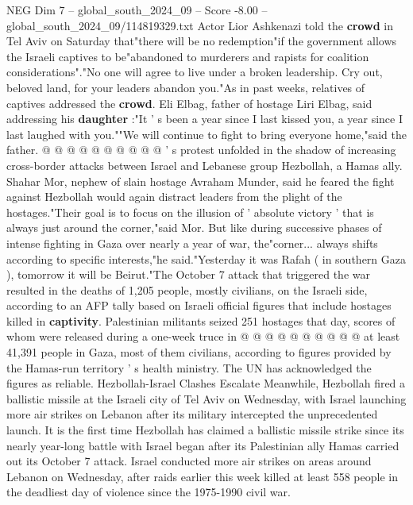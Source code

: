 \begin{textsample}{NEG Dim 7 – global\_south\_2024\_09 – Score -8.00 – global\_south\_2024\_09/114819329.txt}
Actor Lior Ashkenazi told the \textbf{crowd} in Tel Aviv on Saturday that"there will be no redemption"if the government allows the Israeli captives to be"abandoned to murderers and rapists for coalition considerations"."No one will agree to live under a broken leadership.
Cry out, beloved land, for your leaders abandon you."As in past weeks, relatives of captives addressed the \textbf{crowd}.
Eli Elbag, father of hostage Liri Elbag, said addressing his \textbf{daughter} :"It ' s been a year since I last kissed you, a year since I last laughed with you.""We will continue to fight to bring everyone home,"said the father. @ @ @ @ @ @ @ @ @ @ ' s protest unfolded in the shadow of increasing cross-border attacks between Israel and Lebanese group Hezbollah, a Hamas ally.
Shahar Mor, nephew of slain hostage Avraham Munder, said he feared the fight against Hezbollah would again distract leaders from the plight of the hostages."Their goal is to focus on the illusion of ' absolute victory ' that is always just around the corner,"said Mor.
But like during successive phases of intense fighting in Gaza over nearly a year of war, the"corner... always shifts according to specific interests,"he said."Yesterday it was Rafah ( in southern Gaza ), tomorrow it will be Beirut."The October 7 attack that triggered the war resulted in the deaths of 1,205 people, mostly civilians, on the Israeli side, according to an AFP tally based on Israeli official figures that include hostages killed in \textbf{captivity}.
Palestinian militants seized 251 hostages that day, scores of whom were released during a one-week truce in @ @ @ @ @ @ @ @ @ @ at least 41,391 people in Gaza, most of them civilians, according to figures provided by the Hamas-run territory ' s health ministry.
The UN has acknowledged the figures as reliable.
Hezbollah-Israel Clashes Escalate Meanwhile, Hezbollah fired a ballistic missile at the Israeli city of Tel Aviv on Wednesday, with Israel launching more air strikes on Lebanon after its military intercepted the unprecedented launch.
It is the first time Hezbollah has claimed a ballistic missile strike since its nearly year-long battle with Israel began after its Palestinian ally Hamas carried out its October 7 attack.
Israel conducted more air strikes on areas around Lebanon on Wednesday, after raids earlier this week killed at least 558 people in the deadliest day of violence since the 1975-1990 civil war.

\end{textsample}

